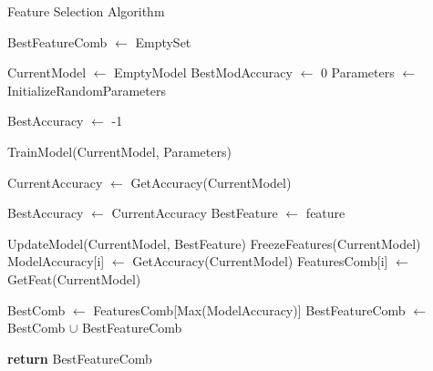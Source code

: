 \begin{algorithm}[t] \small
	\caption{Feature Selection Algorithm}\label{alg:feature_selection}

	\begin{algorithmic}[1]

		\State BestFeatureComb $\gets$ EmptySet

		\State CurrentModel $\gets$ EmptyModel
		\State BestModAccuracy $\gets$ 0
		\State Parameters $\gets$ InitializeRandomParameters

		\State BestAccuracy $\gets$ -1

		\State TrainModel(CurrentModel, Parameters)

		\State CurrentAccuracy $\gets$ GetAccuracy(CurrentModel)

		\State BestAccuracy $\gets$ CurrentAccuracy
		\State BestFeature $\gets$ feature

		\EndIf
		\State UpdateModel(CurrentModel, BestFeature)
		\EndFor
		\State FreezeFeatures(CurrentModel)
		\State ModelAccuracy[i] $\gets$ GetAccuracy(CurrentModel)
		\State FeaturesComb[i] $\gets$ GetFeat(CurrentModel)

		\EndFor

		\State BestComb $\gets$ FeaturesComb[Max(ModelAccuracy)]
		\State BestFeatureComb $\gets$ BestComb $\cup$ BestFeatureComb

		\EndFor

		\State \textbf{return} BestFeatureComb
	\end{algorithmic}
\end{algorithm}

